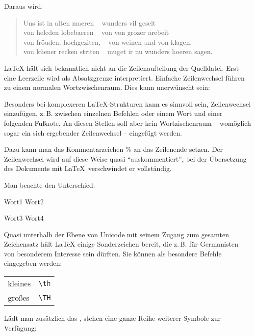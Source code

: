 Daraus wird:

 \begin{verse}
 Uns ist in alten maeren ~ wunders vil geseit\\
 von heleden lobebaeren ~ von von grozer arebeit\\
 von fröuden, hochgeziten, ~ von weinen und von klagen,\\
 von küener recken striten ~ muget ir nu wunders hoeren sagen.
 \end{verse}



\LaTeX{} hält sich bekanntlich nicht an die Zeilenaufteilung der Quelldatei. Erst eine Leerzeile
wird als Absatzgrenze interpretiert. Einfache Zeilenwechsel führen zu einem normalen 
Wortzwischenraum. Dies kann unerwünscht sein:

Besonders bei komplexeren \LaTeX -Strukturen kann es sinnvoll sein, Zeilenwechsel einzufügen,
z.\,B. zwischen einzelnen Befehlen oder einem Wort und einer folgenden Fußnote.
An diesen Stellen soll aber kein Wortzischenraum -- womöglich sogar ein sich ergebender 
Zeilenwechsel -- eingefügt werden.

Dazu kann man das Kommentarzeichen \% an das Zeilenende setzen. Der Zeilenwechsel wird auf diese 
Weise quasi \enquote{auskommentiert}, bei der Übersetzung des Dokuments mit \LaTeX\
verschwindet er vollständig.

Man beachte den Unterschied:

\begin{LTXexample}
 Wort1
 Wort2
 
 Wort3%
 Wort4
\end{LTXexample}



Quasi unterhalb der Ebene von Unicode mit seinem Zugang zum gesamten Zeichensatz hält 
\LaTeX{} einige Sonderzeichen bereit, die z.\,B. für Germanisten von besonderem Interesse
sein dürften. Sie können als besondere Befehle eingegeben werden:

\begin{tabular}{ll}
 kleines \th & 	\lstinline/\th/ \\
 großes \TH & 	\lstinline/\TH/ \\
\end{tabular}

Lädt man zusätzlich das , stehen eine ganze Reihe weiterer Symbole
zur Verfügung:

